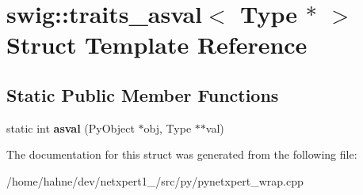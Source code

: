 \hypertarget{structswig_1_1traits__asval_3_01Type_01_5_01_4}{}\section{swig\+:\+:traits\+\_\+asval$<$ Type $\ast$ $>$ Struct Template Reference}
\label{structswig_1_1traits__asval_3_01Type_01_5_01_4}
\subsection*{Static Public Member Functions}
\begin{DoxyCompactItemize}
\item 
static int {\bfseries asval} (Py\+Object $\ast$obj, Type $\ast$$\ast$val)\hypertarget{structswig_1_1traits__asval_3_01Type_01_5_01_4_a32b6c9822265d2822408db76cbae92c4}{}\label{structswig_1_1traits__asval_3_01Type_01_5_01_4_a32b6c9822265d2822408db76cbae92c4}

\end{DoxyCompactItemize}


The documentation for this struct was generated from the following file\+:\begin{DoxyCompactItemize}
\item 
/home/hahne/dev/netxpert1\+\_/src/py/pynetxpert\+\_\+wrap.\+cpp\end{DoxyCompactItemize}
